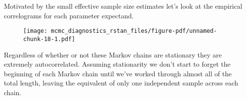 \documentclass[
  letterpaper,
  DIV=11,
  numbers=noendperiod]{scrartcl}
\newenvironment{Shaded}{\begin{snugshade}}{\end{snugshade}}
\newcommand{\AttributeTok}[1]{\textcolor[rgb]{0.40,0.45,0.13}{#1}}
\newcommand{\DecValTok}[1]{\textcolor[rgb]{0.68,0.00,0.00}{#1}}
\newcommand{\FloatTok}[1]{\textcolor[rgb]{0.68,0.00,0.00}{#1}}
\newcommand{\FunctionTok}[1]{\textcolor[rgb]{0.28,0.35,0.67}{#1}}
\newcommand{\NormalTok}[1]{\textcolor[rgb]{0.00,0.23,0.31}{#1}}
\newcommand{\SpecialCharTok}[1]{\textcolor[rgb]{0.37,0.37,0.37}{#1}}
\newcommand{\StringTok}[1]{\textcolor[rgb]{0.13,0.47,0.30}{#1}}
\begin{document}
Motivated by the small effective sample size estimates let's look at the
empirical correlograms for each parameter expectand.

\begin{Shaded}
\end{Shaded}

\begin{figure}[H]

{\centering \texttt{[image: mcmc\_diagnostics\_rstan\_files/figure-pdf/unnamed-chunk-18-1.pdf]}

}

\end{figure}

Regardless of whether or not these Markov chains are stationary they are
extremely autocorrelated. Assuming stationarity we don't start to forget
the beginning of each Markov chain until we've worked through almost all
of the total length, leaving the equivalent of only one independent
sample across each chain.
\end{document}
